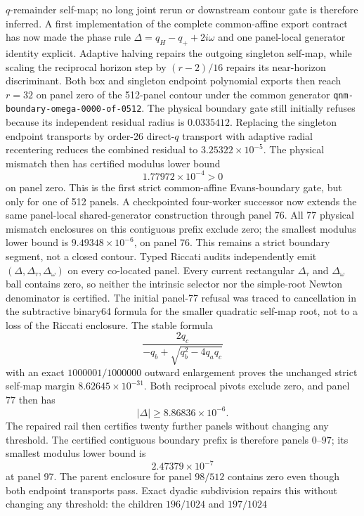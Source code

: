 \documentclass[11pt]{article}
\theoremstyle{definition}
\theoremstyle{remark}
\begin{document}
\(q\)-remainder self-map; no long joint rerun or downstream contour gate is
therefore inferred.  A first implementation of the complete common-affine
export contract has now made the phase rule
\(\Delta=q_H-q_++2i\omega\) and one panel-local generator identity explicit.
Adaptive halving repairs the outgoing singleton self-map, while scaling the
reciprocal horizon step by \((r-2)/16\) repairs its near-horizon
discriminant.  Both box and singleton endpoint polynomial exports then reach
\(r=32\) on panel zero of the 512-panel contour under the common generator
\texttt{qnm-boundary-omega-0000-of-0512}.  The physical boundary gate still
initially refuses because its independent residual radius is \(0.0335412\).
Replacing the singleton endpoint transports by order-26 direct-\(q\)
transport with adaptive radial recentering reduces the combined residual to
\(3.25322\times10^{-5}\).  The physical mismatch then has certified modulus
lower bound
\[
 1.77972\times10^{-4}>0
\]
on panel zero.  This is the first strict common-affine Evans-boundary gate,
but only for one of 512 panels.  A checkpointed four-worker successor now
extends the same panel-local shared-generator construction through panel 76.
All 77 physical mismatch enclosures on this contiguous prefix exclude zero;
the smallest modulus lower bound is \(9.49348\times10^{-6}\), on panel 76.
This remains a strict boundary segment, not a closed contour.  Typed Riccati
audits independently emit \((\Delta,\Delta_\tau,\Delta_\omega)\) on every
co-located panel.  Every current rectangular \(\Delta_\tau\) and
\(\Delta_\omega\) ball contains zero, so neither the intrinsic selector nor
the simple-root Newton denominator is certified.  The initial panel-77
refusal was traced to cancellation in the subtractive binary64 formula for
the smaller quadratic self-map root, not to a loss of the Riccati
enclosure.  The stable formula
\[
 \frac{2q_c}{-q_b+\sqrt{q_b^2-4q_aq_c}}
\]
with an exact \(1000001/1000000\) outward enlargement proves the unchanged
strict self-map margin \(8.62645\times10^{-31}\).  Both reciprocal pivots
exclude zero, and panel 77 then has
\[
 |\Delta|\ge 8.86836\times10^{-6}.
\]
The repaired rail then certifies twenty further panels without changing any
threshold.  The certified contiguous boundary prefix is therefore panels
\(0\)--\(97\); its smallest modulus lower bound is
\[
 2.47379\times10^{-7}
\]
at panel 97.  The parent enclosure for panel \(98/512\) contains zero even
though both endpoint transports pass.  Exact dyadic subdivision repairs this
without changing any threshold: the children \(196/1024\) and \(197/1024\)
\end{document}
